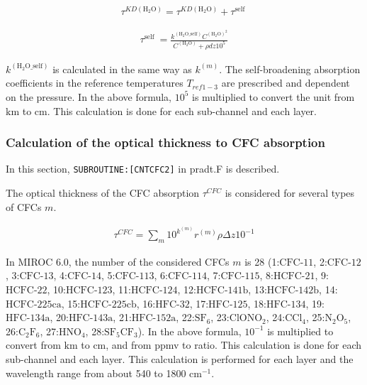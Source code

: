 \begin{eqnarray}
\tau^{K D\left(\mathrm{H_2O}\right)}=\tau^{K D\left(\mathrm{H_2O}\right)}+\tau^{\text {self }}
\end{eqnarray}

\begin{eqnarray}
\tau^{\text {self }}=\frac{k^{\left(\mathrm{H_2O\_self}\right)} C^{\left(\mathrm{H_2O}\right)^{2}}}{C^{\left(\mathrm{H_2O}\right)}+\rho d z 10^{5}}
\end{eqnarray}

\(k^{(\mathrm{H_2O\_self})}\) is calculated in the same way as \(k^{(m)}\). The self-broadening absorption coefficients in the reference temperatures \(T_{ref1-3}\) are prescribed and dependent on the
pressure. In the above formula, \(10^{5}\) is multiplied to convert the unit from \(\mathrm{km}\) to \(\mathrm{cm}\). This calculation is done for each sub-channel and each layer.

\hypertarget{calculation-of-the-optical-thickness-to-cfc-absorption}{%
\subsubsection{Calculation of the optical thickness to CFC absorption}\label{calculation-of-the-optical-thickness-to-cfc-absorption}}

In this section, \texttt{SUBROUTINE:{[}CNTCFC2{]}} in pradt.F is described.

The optical thickness of the CFC absorption \(\tau^{CFC}\) is considered for several types of CFCs \(m\).

\begin{eqnarray}
\tau^{C F C}=\sum_{m} 10^{k^{(m)}} r^{(m)} \rho \Delta z 10^{-1}
\end{eqnarray}

In MIROC 6.0, the number of the considered CFCs \(m\) is 28 (1:\(\mathrm{CFC\text{-11}}\), 2:\(\mathrm{CFC\text{-12}}\), 3:\(\mathrm{CFC\text{-13}}\), 4:\(\mathrm{CFC\text{-14}}\),
5:\(\mathrm{CFC\text{-113}}\), 6:\(\mathrm{CFC\text{-114}}\), 7:\(\mathrm{CFC\text{-115}}\), 8:\(\mathrm{HCFC\text{-21}}\), 9:\(\mathrm{HCFC\text{-22}}\), 10:\(\mathrm{HCFC\text{-123}}\),
11:\(\mathrm{HCFC\text{-124}}\), 12:\(\mathrm{HCFC\text{-141b}}\), 13:\(\mathrm{HCFC\text{-142b}}\), 14:\(\mathrm{HCFC\text{-225ca}}\), 15:\(\mathrm{HCFC\text{-225cb}}\),
16:\(\mathrm{HFC\text{-32}}\), 17:\(\mathrm{HFC\text{-125}}\), 18:\(\mathrm{HFC\text{-134}}\), 19:\(\mathrm{HFC\text{-134a}}\), 20:\(\mathrm{HFC\text{-143a}}\), 21:\(\mathrm{HFC\text{-152a}}\),
22:\(\mathrm{SF_6}\), 23:\(\mathrm{ClONO_2}\), 24:\(\mathrm{CCl_4}\), 25:\(\mathrm{N_2O_5}\), 26:\(\mathrm{C_2F_6}\), 27:\(\mathrm{HNO_4}\), 28:\(\mathrm{SF_5CF_3}\)). In the above formula,
\(10^{-1}\) is multiplied to convert from \(\mathrm{km}\) to \(\mathrm{cm}\), and from ppmv to ratio. This calculation is done for each sub-channel and each layer. This calculation is performed for
each layer and the wavelength range from about 540 to 1800 \(\mathrm{cm}^{-1}\).

